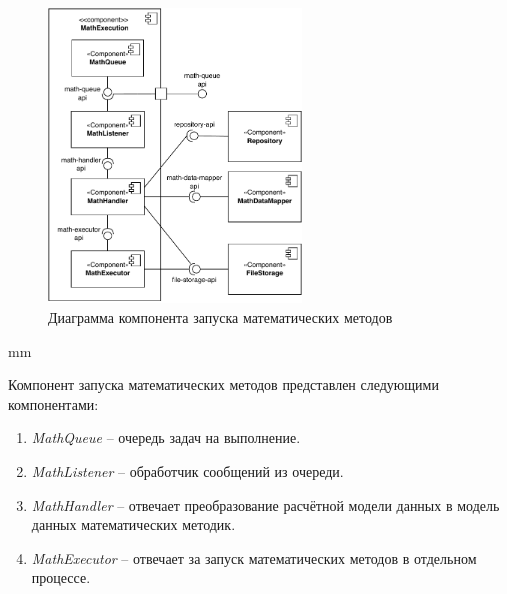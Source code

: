 \begin{figure}[H]
	\includegraphics[width=0.6\textwidth]{architecture/pictures/executor/component_detailed}
	\caption{Диаграмма компонента запуска математических методов}
	\label{pic:architecture__executor-detailed-component}
\end{figure}
 mm

Компонент запуска математических методов представлен следующими компонентами:
\begin{enumerate}
	\item {
		\textit{MathQueue} -- очередь задач на выполнение.
	}
	\item {
		\textit{MathListener} -- обработчик сообщений из очереди.
	}
	\item {
		\textit{MathHandler} -- отвечает преобразование расчётной модели данных в модель данных математических методик.
	}
	\item {
		\textit{MathExecutor} -- отвечает за запуск математических методов в отдельном процессе.
	}
\end{enumerate}